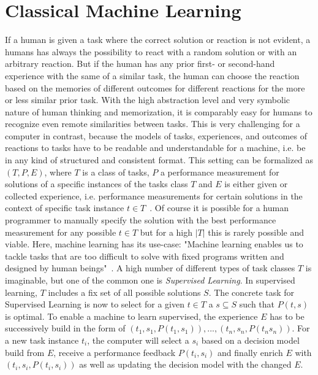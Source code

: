 \section{Classical Machine Learning}
\label{sec:theory:ml}
If a human is given a task where the correct solution or reaction is not evident, a humans has always the possibility to react with a random solution or with an arbitrary reaction.
But if the human has any prior first- or second-hand experience with the same of a similar task, the human can choose the reaction based on the memories of different outcomes for different reactions for the more or less similar prior task.
With the high abstraction level and very symbolic nature of human thinking and memorization, it is comparably easy for humans to recognize even remote similarities between tasks.\newline
This is very challenging for a computer in contrast, because the models of tasks, experiences, and outcomes of reactions to tasks have to be readable and understandable for a machine, i.e. be in any kind of structured and consistent format.
This setting can be formalized as $(T, P, E)$, where $T$ is a class of tasks, $P$ a performance measurement for solutions of a specific instances of the tasks class $T$ and $E$ is either given or collected experience, i.e. performance measurements for certain solutions in the context of specific task instance $t\in T$~\cite{Mitchell-MachineLearning}.\newline
Of course it is possible for a human programmer to manually specify the solution with the best performance measurement for any possible $t\in T$ but for a high $|T|$ this is rarely possible and viable.
Here, machine learning has its use-case: "Machine learning enables us to tackle tasks that are too diﬃcult to solve with ﬁxed programs written and designed by human beings"~\cite{Goodfellow-DeepLearning}.\newline
A high number of different types of task classes $T$ is imaginable, but one of the common one is \textit{Supervised Learning}.
In supervised learning, $T$ includes a fix set of all possible solutions $S$.
The concrete task for Supervised Learning is now to select for a given $t\in T$ a $s\subseteq S$ such that $P(t,s)$ is optimal.
To enable a machine to learn supervised, the experience $E$ has to be successively build in the form of ${(t_1, s_1, P(t_1, s_1)), ..., (t_n, s_n, P(t_n s_n))}$.
For a new task instance $t_i$, the computer will select a $s_i$ based on a decision model build from $E$, receive a performance feedback $P(t_i, s_i)$ and finally enrich $E$ with $(t_i, s_i, P(t_i, s_i))$ as well as updating the decision model with the changed $E$.
